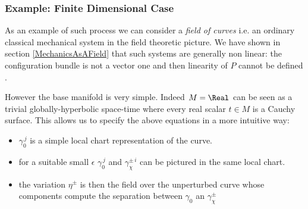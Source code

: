 \documentclass[Main]{subfiles}
\begin{document}
	\subsubsection{Example: Finite Dimensional Case} 
		As an example of such process we can consider a \emph{field of curves} i.e. an ordinary classical mechanical system in the field theoretic picture.
		We have shown in section \ref{MechanicsAsAField} that such systems are generally non linear: the configuration bundle is not a vector one and then linearity of $P$ cannot be defined .
			
		However the base manifold is very simple. Indeed $M= \Real$ can be seen as a trivial globally-hyperbolic space-time where every real scalar $t\in M$ is a Cauchy surface.
		This allows us to specify the above equations in a more intuitive way:
		\begin{itemize}
			\item $\gamma_0^{\, j}$ is a simple local chart representation of the curve.
			\item for a suitable small $\epsilon$  $\gamma_0^{\, j}$ and $\gamma_{\chi}^{\pm\,i} $ can be pictured in the same local chart.
			\item the variation $\eta^\pm$ is then the field over the unperturbed curve whose components compute the separation between $\gamma_0$ an $\gamma_{\chi}^{\pm} $
		\end{itemize}
	
				\begin{minipage}{\linewidth}%
			
			\label{GraphicAdvRetSol}%
			
			\end{minipage}
	 
	
		 	
	 	
\end{document}
